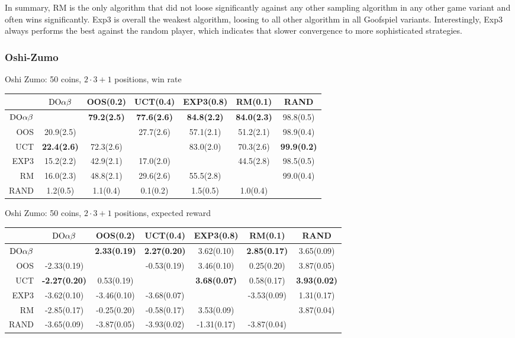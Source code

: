 In summary, RM is the only algorithm that did not loose significantly against any other sampling algorithm in any other game variant and often wins significantly.
Exp3 is overall the weakest algorithm, loosing to all other algorithm in all Goofspiel variants.
Interestingly, Exp3 always performs the best against the random player, which indicates that slower convergence to more sophisticated strategies.  

\subsubsection{Oshi-Zumo}

\begin{table}[t!]
\centering
\begin{scriptsize}

Oshi Zumo: 50 coins, $2\cdot 3 + 1$ positions, win rate
\begin{tabular}{|r|cccccc|}\hline
&$\textrm{DO}\alpha\beta$&OOS(0.2)&UCT(0.4)&EXP3(0.8)&RM(0.1)&RAND\\\hline
$\textrm{DO}\alpha\beta$&&\textbf{79.2(2.5)}&\textbf{77.6(2.6)}&\textbf{84.8(2.2)}&\textbf{84.0(2.3)}&98.8(0.5)\\
OOS&20.9(2.5)&&27.7(2.6)&57.1(2.1)&51.2(2.1)&98.9(0.4)\\
UCT&\textbf{22.4(2.6)}&72.3(2.6)&&83.0(2.0)&70.3(2.6)&\textbf{99.9(0.2)}\\
EXP3&15.2(2.2)&42.9(2.1)&17.0(2.0)&&44.5(2.8)&98.5(0.5)\\
RM&16.0(2.3)&48.8(2.1)&29.6(2.6)&55.5(2.8)&&99.0(0.4)\\
RAND&1.2(0.5)&1.1(0.4)&0.1(0.2)&1.5(0.5)&1.0(0.4)&\\
\hline
\end{tabular}

Oshi Zumo: 50 coins, $2\cdot 3 + 1$ positions, expected reward
\begin{tabular}{|r|cccccc|}\hline
&$\textrm{DO}\alpha\beta$&OOS(0.2)&UCT(0.4)&EXP3(0.8)&RM(0.1)&RAND\\\hline
$\textrm{DO}\alpha\beta$&&\textbf{2.33(0.19)}&\textbf{2.27(0.20)}&3.62(0.10)&\textbf{2.85(0.17)}&3.65(0.09)\\
OOS&-2.33(0.19)&&-0.53(0.19)&3.46(0.10)&0.25(0.20)&3.87(0.05)\\
UCT&\textbf{-2.27(0.20)}&0.53(0.19)&&\textbf{3.68(0.07)}&0.58(0.17)&\textbf{3.93(0.02)}\\
EXP3&-3.62(0.10)&-3.46(0.10)&-3.68(0.07)&&-3.53(0.09)&1.31(0.17)\\
RM&-2.85(0.17)&-0.25(0.20)&-0.58(0.17)&3.53(0.09)&&3.87(0.04)\\
RAND&-3.65(0.09)&-3.87(0.05)&-3.93(0.02)&-1.31(0.17)&-3.87(0.04)&\\
\hline
\end{tabular}


\end{scriptsize}
\end{table}
